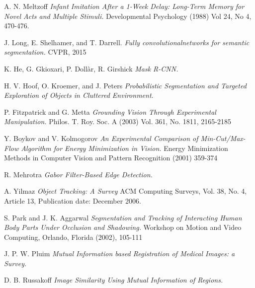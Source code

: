\documentclass{article}
\begin{document}
\begin{thebibliography}{9}

	A. N. Meltzoff
	\emph{Infant Imitation After a 1-Week Delay: Long-Term Memory for Novel Acts and Multiple Stimuli.}
	Developmental Psychology (1988) Vol 24, No 4, 470-476.
	
	J. Long, E. Shelhamer, and T. Darrell. 
	\emph{Fully convolutionalnetworks for semantic segmentation.}
	CVPR, 2015

	K. He, G. Gkioxari, P. Doll\`ar, R. Girshick
	\emph{Mask R-CNN.}
	
  H. V. Hoof, O. Kroemer, and J. Peters
  \emph{Probabilistic Segmentation and Targeted Exploration of Objects in Cluttered Environment.}
  
	P. Fitzpatrick and G. Metta 
	\emph{Grounding Vision Through Experimental Manipulation.}
	Philos. T. Roy. Soc. A (2003) Vol. 361, No. 1811, 2165-2185
	
	Y. Boykov and V. Kolmogorov
	\emph{An Experimental Comparison of Min-Cut/Max-Flow Algorithm for Energy Minimization in Vision.}
	Energy Minimization Methods in Computer Vision and Pattern Recognition (2001) 359-374

	R. Mehrotra
	\emph{Gabor Filter-Based Edge Detection.}
	
	A. Yilmaz
	\emph{Object Tracking: A Survey} ACM Computing Surveys, Vol. 38, No. 4, Article 13, Publication date: December 2006.

	S. Park and J. K. Aggarwal
	\emph{Segmentation and Tracking of Interacting Human Body Parts Under Occlusion and Shadowing.} Workshop on Motion and Video Computing, Orlando, Florida (2002), 105-111

	J. P. W. Pluim
	\emph{Mutual Information based Registration of Medical Images: a Survey.}
	
	D. B. Russakoff
	\emph{Image Similarity Using Mutual Information of Regions.}
	
\end{thebibliography}
\end{document}
